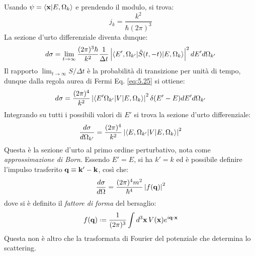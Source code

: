 Usando $ \psi = \braket{\mathbf{x} | E, \Omega_k} $ e prendendo il modulo, si trova:
\begin{equation}
	j_k = \frac{k^2}{\hbar (2\pi)^3}
	\label{eq:5.30}
\end{equation}
La sezione d'urto differenziale diventa dunque:
\begin{equation*}
	d \sigma = \lim_{t \rightarrow \infty} \frac{(2\pi)^3 \hbar}{k^2} \frac{1}{\Delta t} \left\lvert\braket{E', \Omega_{k'} | \hat{S}(t,-t) | E, \Omega_k}\right\rvert^2 dE' d \Omega_{k'}
\end{equation*}
Il rapporto $ \lim_{t \rightarrow \infty} S / \Delta t $ è la probabilità di transizione per unità di tempo, dunque dalla regola aurea di Fermi Eq. \ref{eq:5.25} si ottiene:
\begin{equation*}
	d \sigma = \frac{(2\pi)^4}{k^2} \left\lvert\braket{E' \Omega_{k'} | V | E, \Omega_k}\right\rvert^2 \delta(E' - E) dE' d \Omega_{k'}
\end{equation*}
Integrando su tutti i possibili valori di $ E' $ si trova la sezione d'urto differenziale:
\begin{equation*}
	\frac{d \sigma}{d \Omega_{k'}} = \frac{(2\pi)^4}{k^2} \left\lvert\braket{E, \Omega_{k'} | V | E, \Omega_k}\right\rvert^2
\end{equation*}
Questa è la sezione d'urto al primo ordine perturbativo, nota come \textit{approssimazione di Born}. Essendo $ E' = E $, si ha $ k' = k $ ed è possibile definire l'impulso trasferito $ \mathbf{q} \equiv \mathbf{k}' - \mathbf{k} $, così che:
\begin{equation}
	\frac{d \sigma}{d \Omega} = \frac{(2\pi)^4 m^2}{\hbar^4} \left\lvert f(\mathbf{q})\right\rvert^2
	\label{eq:5.31}
\end{equation}
dove si è definito il \textit{fattore di forma} del bersaglio:
\begin{equation}
	f(\ve{q}) \defeq \frac{1}{(2\pi)^3} \int d^3 \ve{x}\, V(\ve{x}) e^{i \ve{q} \cdot \ve{x}}
	\label{eq:5.32}
\end{equation}
Questa non è altro che la trasformata di Fourier del potenziale che determina lo scattering.

